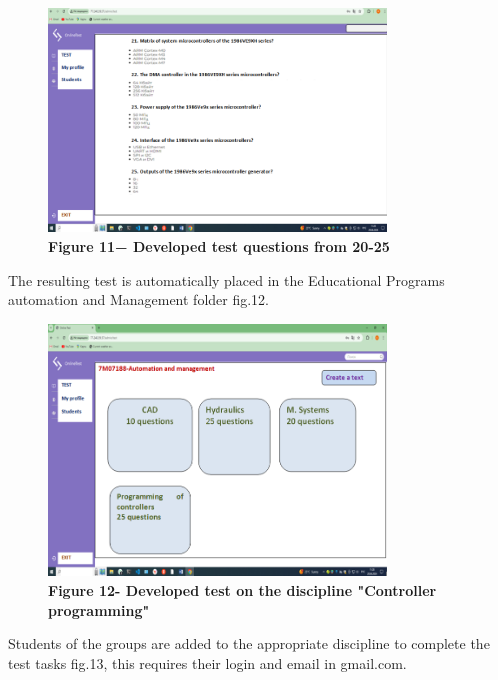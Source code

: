 \begin{figure}[H]
	\centering
	\includegraphics[width=0.8\textwidth]{assets/136}
	\caption*{\bfseries Figure 11− Developed test questions from 20-25}
\end{figure}


The resulting test is automatically placed in the Educational Programs
automation and Management folder fig.12.

\begin{figure}[H]
	\centering
	\includegraphics[width=0.8\textwidth]{assets/137}
	\caption*{\bfseries Figure 12- Developed test on the discipline "Controller
	programming"}
\end{figure}


Students of the groups are added to the appropriate discipline to
complete the test tasks fig.13, this requires their login and email in
gmail.com.

